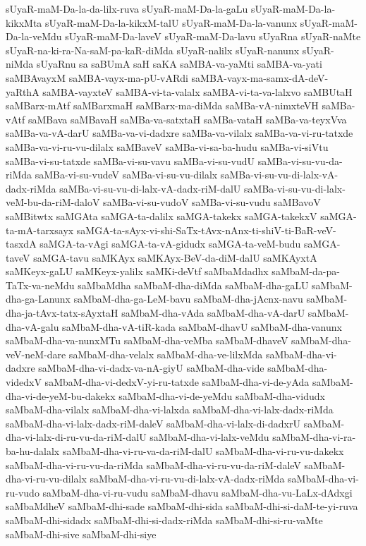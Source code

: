 {sUyaR-maM-Da-la-da-lilx-ruva
sUyaR-maM-Da-la-gaLu
sUyaR-maM-Da-la-kikxMta
sUyaR-maM-Da-la-kikxM-talU
sUyaR-maM-Da-la-vanunx
sUyaR-maM-Da-la-veMdu
sUyaR-maM-Da-laveV
sUyaR-maM-Da-lavu
sUyaRna
sUyaR-naMte
sUyaR-na-ki-ra-Na-saM-pa-kaR-diMda
sUyaR-nalilx
sUyaR-nanunx
sUyaR-niMda
sUyaRnu
sa
saBUmA
saH
saKA
saMBA-va-yaMti
saMBA-va-yati
saMBAvayxM
saMBA-vayx-ma-pU-vARdi
saMBA-vayx-ma-samx-dA-deV-yaRthA
saMBA-vayxteV
saMBA-vi-ta-valalx
saMBA-vi-ta-va-lalxvo
saMBUtaH
saMBarx-mAtf
saMBarxmaH
saMBarx-ma-diMda
saMBa-vA-nimxteVH
saMBa-vAtf
saMBava
saMBavaH
saMBa-va-satxtaH
saMBa-vataH
saMBa-va-teyxVva
saMBa-va-vA-darU
saMBa-va-vi-dadxre
saMBa-va-vilalx
saMBa-va-vi-ru-tatxde
saMBa-va-vi-ru-vu-dilalx
saMBaveV
saMBa-vi-sa-ba-hudu
saMBa-vi-siVtu
saMBa-vi-su-tatxde
saMBa-vi-su-vavu
saMBa-vi-su-vudU
saMBa-vi-su-vu-da-riMda
saMBa-vi-su-vudeV
saMBa-vi-su-vu-dilalx
saMBa-vi-su-vu-di-lalx-vA-dadx-riMda
saMBa-vi-su-vu-di-lalx-vA-dadx-riM-dalU
saMBa-vi-su-vu-di-lalx-veM-bu-da-riM-daloV
saMBa-vi-su-vudoV
saMBa-vi-su-vudu
saMBavoV
saMBitwtx
saMGAta
saMGA-ta-dalilx
saMGA-takekx
saMGA-takekxV
saMGA-ta-mA-tarxsayx
saMGA-ta-sAyx-vi-shi-SaTx-tAvx-nAnx-ti-shiV-ti-BaR-veV-tasxdA
saMGA-ta-vAgi
saMGA-ta-vA-gidudx
saMGA-ta-veM-budu
saMGA-taveV
saMGA-tavu
saMKAyx
saMKAyx-BeV-da-diM-dalU
saMKAyxtA
saMKeyx-gaLU
saMKeyx-yalilx
saMKi-deVtf
saMbaMdadhx
saMbaM-da-pa-TaTx-va-neMdu
saMbaMdha
saMbaM-dha-diMda
saMbaM-dha-gaLU
saMbaM-dha-ga-Lanunx
saMbaM-dha-ga-LeM-bavu
saMbaM-dha-jAcnx-navu
saMbaM-dha-ja-tAvx-tatx-sAyxtaH
saMbaM-dha-vAda
saMbaM-dha-vA-darU
saMbaM-dha-vA-galu
saMbaM-dha-vA-tiR-kada
saMbaM-dhavU
saMbaM-dha-vanunx
saMbaM-dha-va-nunxMTu
saMbaM-dha-veMba
saMbaM-dhaveV
saMbaM-dha-veV-neM-dare
saMbaM-dha-velalx
saMbaM-dha-ve-lilxMda
saMbaM-dha-vi-dadxre
saMbaM-dha-vi-dadx-va-nA-giyU
saMbaM-dha-vide
saMbaM-dha-videdxV
saMbaM-dha-vi-dedxV-yi-ru-tatxde
saMbaM-dha-vi-de-yAda
saMbaM-dha-vi-de-yeM-bu-dakekx
saMbaM-dha-vi-de-yeMdu
saMbaM-dha-vidudx
saMbaM-dha-vilalx
saMbaM-dha-vi-lalxda
saMbaM-dha-vi-lalx-dadx-riMda
saMbaM-dha-vi-lalx-dadx-riM-daleV
saMbaM-dha-vi-lalx-di-dadxrU
saMbaM-dha-vi-lalx-di-ru-vu-da-riM-dalU
saMbaM-dha-vi-lalx-veMdu
saMbaM-dha-vi-ra-ba-hu-dalalx
saMbaM-dha-vi-ru-va-da-riM-dalU
saMbaM-dha-vi-ru-vu-dakekx
saMbaM-dha-vi-ru-vu-da-riMda
saMbaM-dha-vi-ru-vu-da-riM-daleV
saMbaM-dha-vi-ru-vu-dilalx
saMbaM-dha-vi-ru-vu-di-lalx-vA-dadx-riMda
saMbaM-dha-vi-ru-vudo
saMbaM-dha-vi-ru-vudu
saMbaM-dhavu
saMbaM-dha-vu-LaLx-dAdxgi
saMbaMdheV
saMbaM-dhi-sade
saMbaM-dhi-sida
saMbaM-dhi-si-daM-te-yi-ruva
saMbaM-dhi-sidadx
saMbaM-dhi-si-dadx-riMda
saMbaM-dhi-si-ru-vaMte
saMbaM-dhi-sive
saMbaM-dhi-siye
}

